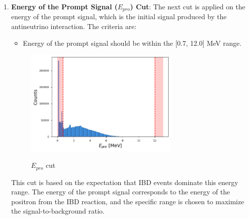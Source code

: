\begin{enumerate}
\begin{figure}[h!]
	\end{figure}
	\vspace{-1\baselineskip}

	\item \textbf{Energy of the Prompt Signal ($E_{pro}$) Cut}: The next cut is applied on the energy of the prompt signal, which is the initial signal produced by the antineutrino interaction. The criteria are:
	\begin{itemize}
		\item Energy of the prompt signal should be within the [0.7, 12.0] MeV range.
	\end{itemize}
	
	\begin{adjustbox}{minipage={\linewidth}, valign=t}
		
		\begin{figure}
			
			\vspace{-1\baselineskip}
			\caption{$E_{pro}$ cut}
			\vspace{-0.5\baselineskip}
			\includegraphics[width=7.5cm]{Images/Cut/e_pro.png}
			\label{fig:e_pto_cut}
			\vspace{-0.2\baselineskip}
			\vspace{-5\baselineskip}
			
		\end{figure}
		
		\vspace*{0.15em}
		
		This cut is based on the expectation that IBD events dominate this energy range. The energy of the prompt signal corresponds to the energy of the positron from the IBD reaction, and the specific range is chosen to maximize the signal-to-background ratio.\\
		\\
		\newline
		\newline
		
	\end{adjustbox}



\end{enumerate}
